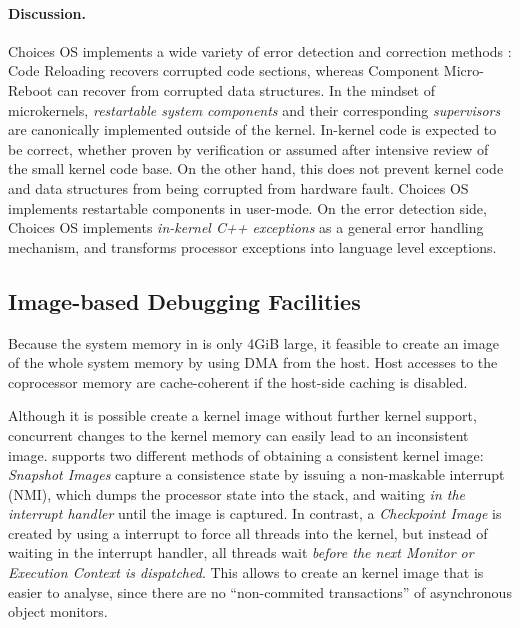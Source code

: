 \paragraph{Discussion.}
Choices OS implements a wide variety of error detection and correction methods \cite{DavidCampbell2007}:
Code Reloading recovers corrupted code sections, whereas Component Micro-Reboot can recover from corrupted data structures.
In the mindset of microkernels, \emph{restartable system components} and their corresponding \emph{supervisors} are canonically implemented outside of the kernel. In-kernel code is expected to be correct, whether proven by verification or assumed after intensive review of the small kernel code base. On the other hand, this does not prevent kernel code and data structures from being corrupted from hardware fault. Choices OS implements restartable components in user-mode.%
On the error detection side, Choices OS implements \emph{in-kernel C++ exceptions} as a general error handling mechanism, and transforms processor exceptions into language level exceptions.

\subsection{Image-based Debugging Facilities}
\label{sec:core-dump}


Because the system memory in \mythos is only 4GiB large, it feasible to create an image of the whole system memory by using DMA from the host. Host accesses to the coprocessor memory are cache-coherent if the host-side caching is disabled.

Although it is possible create a kernel image without further kernel support, concurrent changes to the kernel memory can easily lead to an inconsistent image.
\mythos supports two different methods of obtaining a consistent kernel image: \emph{Snapshot Images} capture a consistence state by issuing a non-maskable interrupt (NMI), which dumps the processor state into the stack, and waiting \emph{in the interrupt handler} until the image is captured. In contrast, a \emph{Checkpoint Image} is created by using a interrupt to force all threads into the kernel, but instead of waiting in the interrupt handler,  all threads wait \emph{before the next Monitor or Execution Context is dispatched}. This allows to create an kernel image that is easier to analyse, since there are no ``non-commited transactions'' of asynchronous object monitors.



